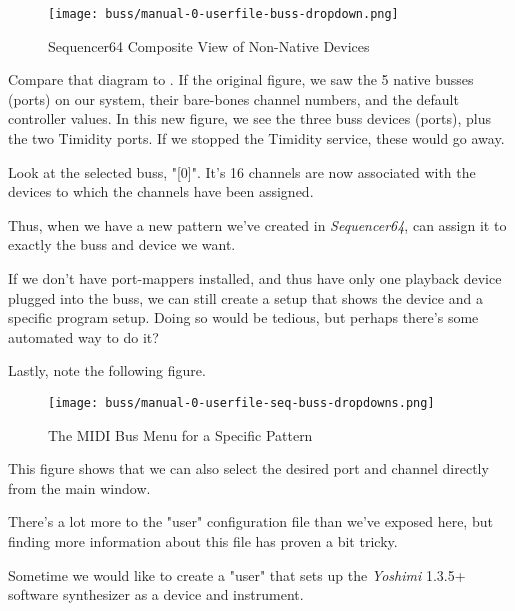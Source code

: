 \begin{figure}[H]
   \centering 
   \texttt{[image: buss/manual-0-userfile-buss-dropdown.png]}
   \caption{Sequencer64 Composite View of Non-Native Devices}
   \label{fig:seq64_manual_0_userfile_buss_dropdown}
\end{figure}

   Compare that diagram to .
   If the original figure, we saw the 5 native busses (ports) on our system,
   their bare-bones channel numbers, and the default controller values.  In
   this new figure, we see the three buss devices (ports), plus the two
   Timidity ports.  If we stopped the Timidity service, these would go away.

   Look at the selected buss, "[0]".  It's 16 channels are now associated with
   the devices to which the channels have been assigned.

   Thus, when we have a new pattern we've created in \textsl{Sequencer64},
   can assign it to exactly the buss and device we want.

   If we don't have port-mappers installed, and thus have only one playback
   device plugged into the buss, we can still create a setup that
   shows the device and a specific program setup.  Doing so would be tedious,
   but perhaps there's some automated way to do it?

   Lastly, note the following figure.

\begin{figure}[H]
   \centering 
   \texttt{[image: buss/manual-0-userfile-seq-buss-dropdowns.png]}
   \caption{The MIDI Bus Menu for a Specific Pattern}
   \label{fig:seq64_manual_0_userfile_seq_buss_dropdown}
\end{figure}

   This figure shows that we can also select the desired port and channel
   directly from the main window.

   There's a lot more to the "user" configuration file than we've exposed here,
   but finding more information about this file has proven a bit tricky.

   Sometime we would like to create a "user" that sets up the
   \textsl{Yoshimi} 1.3.5+ software synthesizer as a device and instrument.

